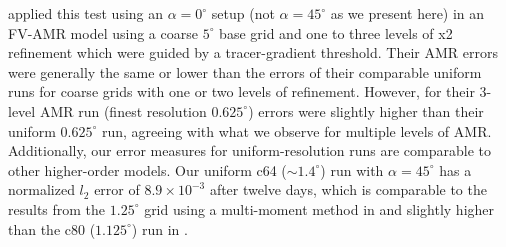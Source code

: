 \cite{Nair:2008fk} applied this test using an $\alpha=0^\circ$ setup (not
$\alpha = 45^\circ$ as we present here) in an FV-AMR model 
using a coarse $5^\circ$ base grid and one to three levels of x2
refinement which were guided by a tracer-gradient threshold.  Their AMR errors
were generally the same or lower than the errors of their comparable uniform
runs for coarse grids with one or two levels of refinement.  However,
for their 3-level AMR run (finest resolution $0.625^\circ$) errors were
slightly higher than their uniform $0.625^\circ$ run, agreeing with what we observe for
multiple levels of AMR.  Additionally, our error measures for uniform-resolution runs are
comparable to other higher-order models.  Our uniform c64 
($\sim 1.4^\circ$) run with 
$\alpha=45^\circ$ has a normalized $l_2$ error of $8.9\times 10^{-3}$ 
after twelve days, which is comparable to the results from the 
$1.25^\circ$ grid using a multi-moment method in
\cite{chen2011multi} and slightly higher than the c80 ($1.125^\circ$) run
in
\cite{lauritzen2010conservative}.
%
\begin{table}
    \caption{Run times (wall-clock time in s and as \% of c512 run time)
for 12-day moving-vortices advection simulations
(Section~\ref{subsec:moving-vortices}).
    These runs had a maximum resolution of
    c512, performed on two nodes of NCAR's Yellowstone computing platform with 32 processors total. 
    Number of cells per refinement level is given at day 12, and
    as a percent of the c512 uniform run. }%
    \label{tb:adv_time}
\end{table}

